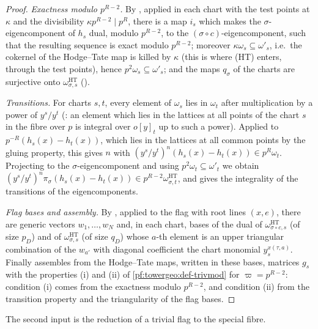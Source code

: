 \begin{proof}
\emph{Exactness modulo $p^{R-2}$.} By , applied in each chart
with the test points at $\kappa$ and the divisibility $\kappa p^{R-2}\mid p^R$, there is a map $i_s$ which makes
the $\sigma$-eigencomponent of $h_s$ dual, modulo $p^{R-2}$, to the $(\sigma\circ c)$-eigencomponent, such that the
resulting sequence is exact modulo $p^{R-2}$; moreover $\kappa\omega_s\subseteq\omega'_s$, i.e.\ the cokernel of the
Hodge--Tate map is killed by $\kappa$ (this is where (HT) enters, through the test points), hence
$p^2\omega_s\subseteq\omega'_s$; and the maps $q_\sigma$ of the charts are surjective onto
$\omega^{\mathrm{HT}}_{\sigma,s}$ ().

\emph{Transitions.} For charts $s,t$, every element of $\omega_s$ lies in $\omega_t$ after multiplication by a
power of $y^s/y^t$ (: an element which lies in
the lattices at all points of the chart $s$ in the fibre over $p$ is integral over $o[y]_t$ up to such a power).
Applied to $p^{-R}(h_s(x)-h_t(x))$, which lies in the lattices at all common points by the gluing property, this
gives $n$ with $(y^s/y^t)^n(h_s(x)-h_t(x))\in p^R\omega_t$. Projecting to the $\sigma$-eigencomponent and using
$p^2\omega_t\subseteq\omega'_t$ we obtain $(y^s/y^t)^n\pi_\sigma(h_s(x)-h_t(x))\in p^{R-2}\omega^{\mathrm{HT}}_{\sigma,t}$,
and  gives the integrality of the transitions of the
eigencomponents.

\emph{Flag bases and assembly.} By , applied to the flag
with root lines $(x,e)$, there are generic vectors $w_1,\dots,w_N$ and, in each chart, bases of the dual of
$\omega^{\mathrm{HT}}_{\sigma\circ c,s}$ (of size $p_D$) and of $\omega^{\mathrm{HT}}_{\sigma,s}$ (of size $q_D$)
whose $a$-th element is an upper triangular combination of the $w_{a'}$ with diagonal coefficient the chart
monomial $y_s^{x(\tau,a)}$. Finally  assembles from the
Hodge--Tate maps, written in these bases, matrices $g_s$ with the properties (i) and (ii) of
\cref{pf:towergeo:def-trivmod} for $\varpi=p^{R-2}$: condition (i) comes from the exactness modulo $p^{R-2}$, and
condition (ii) from the transition property and the triangularity of the flag bases.
\end{proof}

The second input is the reduction of a trivial flag to the special fibre.

